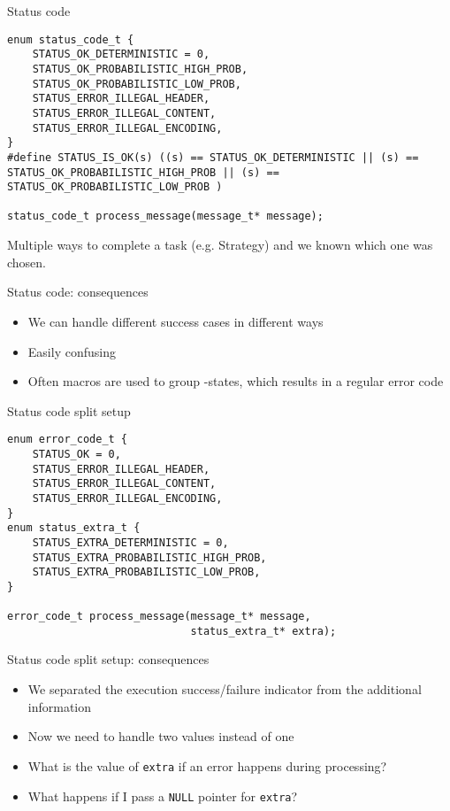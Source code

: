 \documentclass[aspectratio=169,14pt]{beamer}
\begin{document}
\begin{frame}[fragile]{Status code}
\begin{lstlisting}[style=cstyle]
enum status_code_t {
    STATUS_OK_DETERMINISTIC = 0,
    STATUS_OK_PROBABILISTIC_HIGH_PROB,
    STATUS_OK_PROBABILISTIC_LOW_PROB,
    STATUS_ERROR_ILLEGAL_HEADER,
    STATUS_ERROR_ILLEGAL_CONTENT,
    STATUS_ERROR_ILLEGAL_ENCODING,
}
#define STATUS_IS_OK(s) ((s) == STATUS_OK_DETERMINISTIC || (s) == STATUS_OK_PROBABILISTIC_HIGH_PROB || (s) == STATUS_OK_PROBABILISTIC_LOW_PROB )

status_code_t process_message(message_t* message);
\end{lstlisting}

Multiple ways to complete a task (e.g. Strategy) and we known which one was chosen.
\end{frame}



\begin{frame}[fragile]{Status code: consequences}
\begin{itemize}
    \item[\good] We can handle different success cases in different ways
    \item[\bad] Easily confusing
    \item[\bad] Often macros are used to group -states, which results in a regular error code
\end{itemize}
\end{frame}



\begin{frame}[fragile]{Status code split setup}
\begin{lstlisting}[style=cstyle]
enum error_code_t {
    STATUS_OK = 0,
    STATUS_ERROR_ILLEGAL_HEADER,
    STATUS_ERROR_ILLEGAL_CONTENT,
    STATUS_ERROR_ILLEGAL_ENCODING,
}
enum status_extra_t {
    STATUS_EXTRA_DETERMINISTIC = 0,
    STATUS_EXTRA_PROBABILISTIC_HIGH_PROB,
    STATUS_EXTRA_PROBABILISTIC_LOW_PROB,
}

error_code_t process_message(message_t* message,
                             status_extra_t* extra);
\end{lstlisting}
\end{frame}



\begin{frame}[fragile]{Status code split setup: consequences}
\begin{itemize}
    \item[\good] We separated the execution success/failure indicator from the additional information
    \item[\bad] Now we need to handle two values instead of one
    \item[\bad] What is the value of \texttt{extra} if an error happens during processing?
    \item[\meh] What happens if I pass a \texttt{NULL} pointer for \texttt{extra}?
\end{itemize}
\end{frame}
\end{document}
